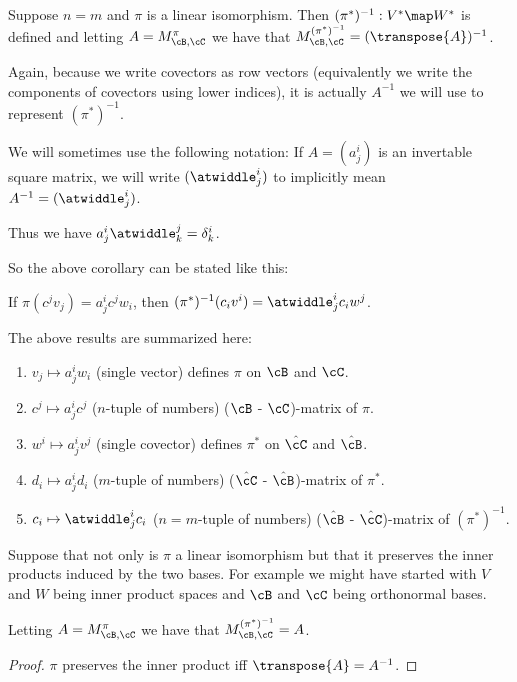 \documentclass[oneside,12pt]{amsart}
\begin{document}
\begin{corollary}
Suppose $n=m$ and $\pi$ is a linear isomorphism. Then
$(\pi^*)^{-1}:V^* \map W^*$ is defined
and letting $A = M^{\pi}_{\cB,\cC}$ we have that
$M^{(\pi^*)^{-1}}_{\cB,\cC} = (\transpose{A})^{-1}$.

Again, because we write covectors as row vectors (equivalently we write the components of covectors using lower indices), it is actually $A^{-1}$ we will use to represent $(\pi^*)^{-1}.$

\end{corollary}

We will sometimes use the following notation:
If $A =(a^i_j)$ is an invertable square matrix, we will write $(\atwiddle^i_j)$ to implicitly
mean $A^{-1} = (\atwiddle^i_j)$.

Thus we have $a^i_j \atwiddle^j_k = \delta^i_k$.

So the above corollary can be stated like this:

If $\pi(c^j v_j) = a^i_j c^j w_i$, then
$(\pi^*)^{-1} (c_i v^i) = \atwiddle^i_j c_i w^j$.

\begin{remarks}
The above results are summarized here:
\begin{enumerate}
\item $v_j \mapsto a^i_j w_i$ (single vector) defines $\pi$ on  $\cB$ and $\cC$.
\item $c^j \mapsto a^i_j c ^j$ ($n$-tuple of numbers) ($\cB$ - $\cC$)-matrix of $\pi$.
\item $w^i \mapsto a^i_j v^j$ (single covector) defines $\pi^*$ on $\hat{\cC}$ and $\hat{\cB}$.
\item $d_i \mapsto a^i_j d_i$ ($m$-tuple of numbers) ($\hat{\cC}$ - $\hat{\cB}$)-matrix of $\pi^*$.
\item $c_i \mapsto \atwiddle^i_j c_i$ ($n=m$-tuple of numbers) ($\hat{\cB}$ - $\hat{\cC}$)-matrix of $(\pi^*)^{-1}$.
\end{enumerate}
\end{remarks}



\begin{corollary}
Suppose that not only is $\pi$ a linear isomorphism but that it preserves
the inner products induced by the two bases. For example we might have
started with $V$ and $W$ being inner product spaces and $\cB$ and $\cC$
being orthonormal bases.

Letting $A = M^{\pi}_{\cB,\cC}$ we have that
$M^{(\pi^*)^{-1}}_{\cB,\cC} = A$.
\end{corollary}
\begin{proof}
$\pi$ preserves the inner product iff $\transpose{A} = A^{-1}$.
\end{proof}
\end{document}
